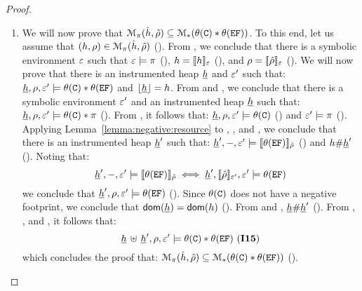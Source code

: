 \begin{proof}
\begin{enumerate}
\item We will now prove that  $\mathcal{M}_{\pi}(\hat{h}, \hat\rho) \subseteq \mathcal{M}_{*}(\theta(\mathtt{C}) \mathbin{*} \theta(\mathtt{EF}))$. 
To this end, let us assume that $(h, \rho) \in \mathcal{M}_{\pi}(\hat{h}, \hat\rho)$ (). 
From , we conclude that there is a symbolic environment $\varepsilon$ such that $\varepsilon \models \pi$ (), 
$h = \llbracket h \rrbracket_{\varepsilon}$ (), and $\rho = \llbracket \hat\rho \rrbracket_{\varepsilon}$ ().
We will now prove that there is an instrumented heap $\underline{h}$  and $\varepsilon'$ such 
that: $\underline{h}, \rho, \varepsilon' \models \theta(\mathtt{C}) \mathbin{*} \theta(\mathtt{EF})$ and $\lfloor \underline{h} \rfloor = h$. 
From  and , we conclude that there is a symbolic environment $\varepsilon'$ and 
an instrumented heap $\underline{h}$ such that: $\underline{h}, \rho, \varepsilon' \models \theta(\mathtt{C}) \mathbin{*} \pi$ (). 
From , it follows that: $\underline{h}, \rho, \varepsilon' \models \theta(\mathtt{C})$ () and $\varepsilon' \models \pi$ ().
Applying Lemma~\ref{lemma:negative:resource} to , , and , we conclude that 
there is an instrumented heap $\underline{h}'$ such that: $\underline{h}', -, \varepsilon' \models \llbracket \theta(\mathtt{EF}) \rrbracket_{\hat\rho}$ () 
and $h \# \underline{h}'$ (). 
Noting that: 
$$
\underline{h}', -, \varepsilon' \models \llbracket \theta(\mathtt{EF}) \rrbracket_{\hat\rho} \iff 
     \underline{h}', \llbracket \hat\rho \rrbracket_{\varepsilon'}, \varepsilon' \models \theta(\mathtt{EF})
$$
we conclude that $\underline{h}', \rho, \varepsilon' \models \theta(\mathtt{EF})$ (). 
Since $\theta(\mathtt{C})$ does not have a negative footprint, we conclude that $\mathsf{dom}(\underline{h}) = \mathsf{dom}(h)$ (). 
From  and , $\underline{h} \# \underline{h}'$ (). 
From , , and , it follows that: 
$$
\underline{h} \, \uplus \, \underline{h}', \rho, \varepsilon' \models \theta(\mathtt{C}) \mathbin{*} \theta(\mathtt{EF}) \text{ ({\bf I15})}
$$  
which concludes the proof that: $\mathcal{M}_{\pi}(\hat{h}, \hat\rho) \subseteq \mathcal{M}_{*}(\theta(\mathtt{C}) \mathbin{*} \theta(\mathtt{EF}))$ (). 
\vspace{4pt}


\end{enumerate}
\end{proof}
